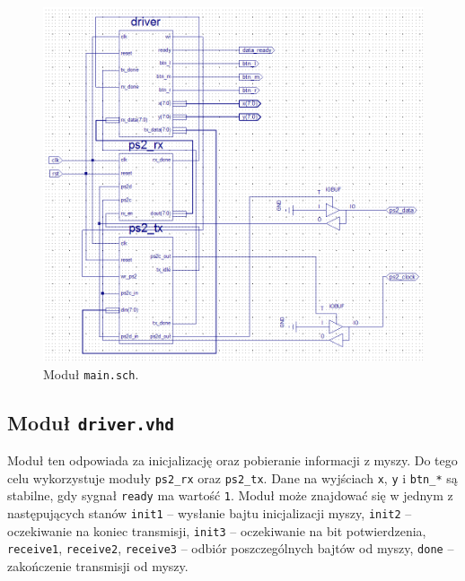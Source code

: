 \begin{figure}[h!]
\begin{center}
\includegraphics[scale=.45]{mouse.png}
\caption{Moduł \texttt{main.sch}.}
\label{fig:mouse}
\end{center}
\end{figure}

\subsection{Moduł \texttt{driver.vhd}}
Moduł ten odpowiada za inicjalizację oraz pobieranie informacji z myszy. Do tego
celu wykorzystuje moduły \texttt{ps2\_rx} oraz \texttt{ps2\_tx}.
Dane na wyjściach \texttt{x}, \texttt{y} i \texttt{btn\_*} są stabilne, gdy
sygnał \texttt{ready} ma wartość \texttt{1}. Moduł może znajdować się w jednym z
następujących stanów \texttt{init1} -- wysłanie bajtu inicjalizacji myszy,
\texttt{init2} -- oczekiwanie na koniec transmisji, \texttt{init3} --
oczekiwanie na bit potwierdzenia, \texttt{receive1}, \texttt{receive2},
\texttt{receive3} -- odbiór poszczególnych bajtów od myszy, \texttt{done} --
zakończenie transmisji od myszy.
\vspace{1em}


